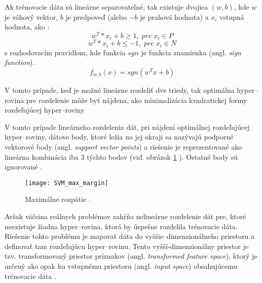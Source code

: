 Ak trénovacie dáta sú lineárne separovatelné, tak existuje dvojica $(w, b)$, kde $w$ je váhový vektor, $b$ je predpoveď
    (alebo $-b$ je prahová hodnota) a $x_i$ vstupná hodnota, ako \cite{prop:SupervisedMachineLearning}:
\begin{equation}
    \label{eq:SVMPair1}
    w^T * x_i + b \geq 1, \; pre \; x_i \in P
\end{equation}
\begin{equation}
    \label{eq:SVMPair2}
    w^T * x_i + b \leq -1, \; pre \; x_i \in N
\end{equation}
s rozhodovacím pravidlom, kde funkcia $sgn$ je funkcia znamienka (angl. \textit{sign function}).
\begin{equation}
    \label{eq:SVMDecisionRule}
    f_{w,b}(x) = sgn(w^T x + b)
\end{equation}

V tomto prípade, keď je možné lineárne rozdeliť dve triedy, tak optimálna hyper--rovina pre rozdelenie
    môže byť nájdena, ako minimalizácia kvadratickej formy rozdeľujúcej hyper--roviny

\begin{comment}
\begin{equation}
    \label{eq:SVMDecisionRule}
    mininimize_{w,h} \; \Phi(w) = \frac{1}{2}||w||^2, \; pre \; y_i(w^Tx_i + b) \geq 1, i = 1, \dots, l
\end{equation}    
\end{comment}

V tomto prípade lineárneho rozdelenia dát, pri nájdení optimálnej rozdeľujúcej hyper--roviny, dátove body, ktoré ležia na jej okraji
    sa nazývajú podporné vektorové body (angl. \textit{support vector points}) a riešenie je reprezentované ako lineárna kombinácia iba 3 týchto bodov (viď. obrázok \ref{pic:SVMMAxMargin} ).
Ostatné body sú ignorované \cite{prop:SupervisedMachineLearning}.

\begin{figure}[H]
	\centering
	\texttt{[image: SVM\_max\_margin]}
	\caption{Maximálne rozpätie \cite{prop:SupervisedMachineLearning}.}
	\label{pic:SVMMAxMargin}
\end{figure}

Avšak väčsina reálnych problémov zahŕňa nelineárne rozdelenie dát pre, ktoré neexistuje žiadna hyper--rovina, ktorá by úspešne rozdelila trénovacie dáta.
Riešenie tohto problému je mapovať dáta do vyššie--dimenzionálneho priestoru a definovať tam rozdeľujúcu hyper--rovinu.
Tento vyšší-dimenzionálny priestor je tzv. transformovaný priestor príznakov (angl. \textit{transformed feature space}), ktorý je určený ako opak ku vstupnému priestoru (angl. \textit{input space}) obsahujúcemu trénovacie dáta \cite{prop:SupervisedMachineLearning}.

